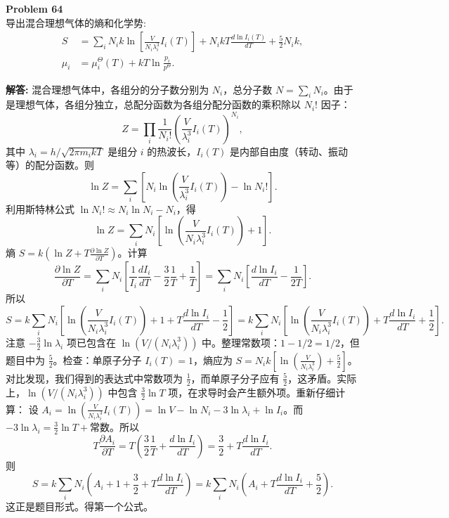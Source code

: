 \documentclass[12pt, a4paper, oneside]{ctexart}
\newenvironment{solution}{\par\noindent\textbf{解答:}\quad}{\par}
\begin{document}
\begin{mdframed}[backgroundcolor=gray!10, linewidth=0pt]
    \textbf{Problem 64} \\
    导出混合理想气体的熵和化学势:
    \[
    \begin{aligned}
        S &= \sum_i N_i k \ln\left[ \frac{V}{N_i \lambda_i^3} I_i(T) \right] + N_i k T \frac{d \ln I_i(T)}{d T} + \frac{5}{2} N_i k, \\
        \mu_i &= \mu_i^\Theta(T) + k T \ln \frac{p_i}{p^\Theta}.
    \end{aligned}
    \]
\end{mdframed}
\begin{solution}
    混合理想气体中，各组分的分子数分别为 $N_i$，总分子数 $N = \sum_i N_i$。由于是理想气体，各组分独立，总配分函数为各组分配分函数的乘积除以 $N_i!$ 因子：
    \[
    Z = \prod_i \frac{1}{N_i!} \left( \frac{V}{\lambda_i^3} I_i(T) \right)^{N_i},
    \]
    其中 $\lambda_i = h / \sqrt{2\pi m_i k T}$ 是组分 $i$ 的热波长，$I_i(T)$ 是内部自由度（转动、振动等）的配分函数。则
    \[
    \ln Z = \sum_i \left[ N_i \ln \left( \frac{V}{\lambda_i^3} I_i(T) \right) - \ln N_i! \right].
    \]
    利用斯特林公式 $\ln N_i! \approx N_i \ln N_i - N_i$，得
    \[
    \ln Z = \sum_i N_i \left[ \ln \left( \frac{V}{N_i \lambda_i^3} I_i(T) \right) + 1 \right].
    \]
    熵 $S = k (\ln Z + T \frac{\partial \ln Z}{\partial T})$。计算
    \[
    \frac{\partial \ln Z}{\partial T} = \sum_i N_i \left[ \frac{1}{I_i} \frac{d I_i}{d T} - \frac{3}{2} \frac{1}{T} + \frac{1}{T} \right] = \sum_i N_i \left[ \frac{d \ln I_i}{d T} - \frac{1}{2T} \right].
    \]
    所以
    \[
    S = k \sum_i N_i \left[ \ln \left( \frac{V}{N_i \lambda_i^3} I_i(T) \right) + 1 + T \frac{d \ln I_i}{d T} - \frac{1}{2} \right] = k \sum_i N_i \left[ \ln \left( \frac{V}{N_i \lambda_i^3} I_i(T) \right) + T \frac{d \ln I_i}{d T} + \frac{1}{2} \right].
    \]
    注意 $-\frac{3}{2} \ln \lambda_i$ 项已包含在 $\ln (V/(N_i \lambda_i^3))$ 中。整理常数项：$1 - 1/2 = 1/2$，但题目中为 $\frac{5}{2}$。检查：单原子分子 $I_i(T)=1$，熵应为 $S = N_i k \left[ \ln \left( \frac{V}{N_i \lambda_i^3} \right) + \frac{5}{2} \right]$。对比发现，我们得到的表达式中常数项为 $\frac{1}{2}$，而单原子分子应有 $\frac{5}{2}$，这矛盾。实际上，$\ln (V/(N_i \lambda_i^3))$ 中包含 $\frac{3}{2} \ln T$ 项，在求导时会产生额外项。重新仔细计算：
    设 $A_i = \ln \left( \frac{V}{N_i \lambda_i^3} I_i(T) \right) = \ln V - \ln N_i - 3 \ln \lambda_i + \ln I_i$。而 $-3 \ln \lambda_i = \frac{3}{2} \ln T + \text{常数}$。所以
    \[
    T \frac{\partial A_i}{\partial T} = T \left( \frac{3}{2} \frac{1}{T} + \frac{d \ln I_i}{d T} \right) = \frac{3}{2} + T \frac{d \ln I_i}{d T}.
    \]
    则
    \[
    S = k \sum_i N_i \left( A_i + 1 + \frac{3}{2} + T \frac{d \ln I_i}{d T} \right) = k \sum_i N_i \left( A_i + T \frac{d \ln I_i}{d T} + \frac{5}{2} \right).
    \]
    这正是题目形式。得第一个公式。


\end{solution}
\end{document}
